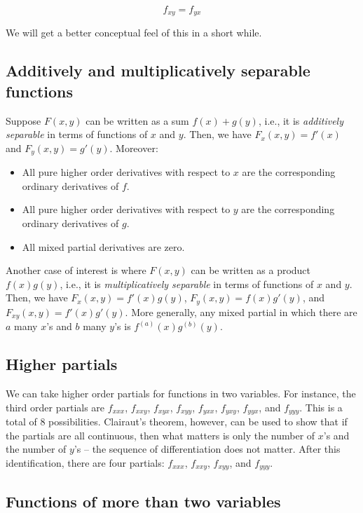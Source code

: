 \documentclass[10pt]{amsart}
\begin{document}
$$f_{xy} = f_{yx}$$

We will get a better conceptual feel of this in a short while.

\subsection{Additively and multiplicatively separable functions}

Suppose $F(x,y)$ can be written as a sum $f(x) + g(y)$, i.e., it is
{\em additively separable} in terms of functions of $x$ and $y$. Then,
we have $F_x(x,y) = f'(x)$ and $F_y(x,y) = g'(y)$. Moreover:

\begin{itemize}
\item All pure higher order derivatives with respect to $x$ are the
  corresponding ordinary derivatives of $f$.
\item All pure higher order derivatives with respect to $y$ are the
  corresponding ordinary derivatives of $g$.
\item All mixed partial derivatives are zero.
\end{itemize}

Another case of interest is where $F(x,y)$ can be written as a product
$f(x)g(y)$, i.e., it is {\em multiplicatively separable} in terms of
functions of $x$ and $y$. Then, we have $F_x(x,y) = f'(x)g(y)$,
$F_y(x,y) = f(x)g'(y)$, and $F_{xy}(x,y) = f'(x)g'(y)$. More
generally, any mixed partial in which there are $a$ many $x$'s and $b$
many $y$'s is $f^{(a)}(x)g^{(b)}(y)$.

\subsection{Higher partials}

We can take higher order partials for functions in two variables. For
instance, the third order partials are $f_{xxx}$, $f_{xxy}$,
$f_{xyx}$, $f_{xyy}$, $f_{yxx}$, $f_{yxy}$, $f_{yyx}$, and
$f_{yyy}$. This is a total of $8$ possibilities. Clairaut's theorem,
however, can be used to show that if the partials are all continuous,
then what matters is only the number of $x$'s and the number of $y$'s
-- the sequence of differentiation does not matter. After this
identification, there are four partials: $f_{xxx}$, $f_{xxy}$,
$f_{xyy}$, and $f_{yyy}$.

\subsection{Functions of more than two variables}
\end{document}
